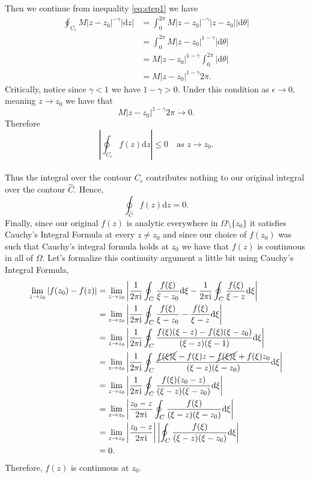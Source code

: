 \documentclass[10pt]{amsart}
\newcommand{\D}{\mathrm{d}}
\newcommand{\I}{\mathrm{i}}
\theoremstyle{nonumberplain}
\begin{document}
\begin{enumerate}[label={\bf {\arabic*}:}]
Then we continue from inequality \eqref{eq:step1} we have
\begin{align*}
\oint_{C_\epsilon} M |z - z_0|^{-\gamma} \left|\D z \right| &= \int_0^{2 \pi} M |z - z_0|^{-\gamma} |z - z_0||\D \theta| \\
	&= \int_0^{2 \pi} M |z - z_0|^{1-\gamma} |\D \theta| \\
	&= M |z - z_0|^{1-\gamma} \int_0^{2 \pi} |\D \theta| \\
	&= M |z - z_0|^{1-\gamma} 2 \pi.
\end{align*}
Critically, notice since $\gamma < 1$ we have $1 - \gamma > 0$.
Under this condition as $\epsilon \rightarrow 0$, meaning $z\rightarrow z_0$ we have that
$$M |z - z_0|^{1-\gamma} 2 \pi \rightarrow 0.$$
Therefore 
$$\left|\oint_{C_\epsilon} f(z)\D z \right| \leq 0 \quad \text{as $z\rightarrow z_0$}.$$
\\
Thus the integral over the contour $C_\epsilon$ contributes nothing to our original integral over the contour $\widehat C$.
Hence,
$$\oint_{\widehat C} f(z)\D z = 0.$$
Finally, since our original $f(z)$ is analytic everywhere in $\Omega \setminus \{z_0\}$ it satisfies Cauchy's Integral Formula at every $z \neq z_0$ and since our choice of $f(z_0)$ was such that Cauchy's integral formula holds at $z_0$ we have that $f(z)$ is continuous in all of $\Omega$.
Let's formalize this continuity argument a little bit using Cauchy's Integral Formula,
\begin{align*}
\lim_{z \rightarrow z_0} \left| f(z_0) - f(z) \right|
	&= \lim_{z \rightarrow z_0} \left| \frac 1 {2\pi \I} \oint_C \frac {f(\xi)}{\xi - z_0} \D \xi - \frac 1 {2\pi \I}\oint_C \frac {f(\xi)}{\xi - z} \D \xi \right| \\
	&= \lim_{z \rightarrow z_0} \left| \frac 1 {2\pi \I} \oint_C \frac {f(\xi)}{\xi - z_0} -  \frac {f(\xi)}{\xi - z} \D \xi \right| \\
	&= \lim_{z \rightarrow z_0} \left| \frac 1 {2\pi \I} \oint_C \frac {f(\xi)(\xi - z) - f(\xi)(\xi - z_0)}{(\xi - z)(\xi - 1)} \D \xi \right| \\
	&= \lim_{z \rightarrow z_0} \left| \frac 1 {2\pi \I} \oint_C \frac {\cancel{f(\xi)\xi} - f(\xi)z - \cancel{f(\xi)\xi} + f(\xi)z_0}{(\xi - z)(\xi - z_0)} \D \xi \right| \\
	&= \lim_{z \rightarrow z_0} \left| \frac 1 {2\pi \I} \oint_C \frac {f(\xi)(z_0 - z)}{(\xi - z)(\xi - z_0)} \D \xi \right| \\
	&= \lim_{z \rightarrow z_0} \left| \frac {z_0 - z} {2\pi \I} \oint_C \frac {f(\xi)}{(\xi - z)(\xi - z_0)} \D \xi \right| \\
	&= \lim_{z \rightarrow z_0} \left| \frac {z_0 - z} {2\pi \I} \right| \left|\oint_C \frac {f(\xi)}{(\xi - z)(\xi - z_0)} \D \xi \right| \\
	&= 0.
\end{align*}
Therefore, $f(z)$ is continuous at $z_0$. \\


\end{enumerate}
\end{document}
